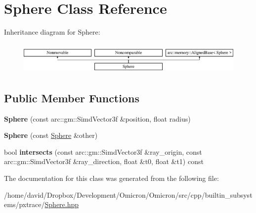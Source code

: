 \hypertarget{class_sphere}{}\section{Sphere Class Reference}
\label{class_sphere}
Inheritance diagram for Sphere\+:\begin{figure}[H]
\begin{center}
\leavevmode
\includegraphics[height=1.616162cm]{class_sphere}
\end{center}
\end{figure}
\subsection*{Public Member Functions}
\begin{DoxyCompactItemize}
\item 
{\bfseries Sphere} (const arc\+::gm\+::\+Simd\+Vector3f \&position, float radius)\hypertarget{class_sphere_a26338c92b077ca0e576b75bb1595fab0}{}\label{class_sphere_a26338c92b077ca0e576b75bb1595fab0}

\item 
{\bfseries Sphere} (const \hyperlink{class_sphere}{Sphere} \&other)\hypertarget{class_sphere_a36f78efd8703554711ab498323d7a63f}{}\label{class_sphere_a36f78efd8703554711ab498323d7a63f}

\item 
bool {\bfseries intersects} (const arc\+::gm\+::\+Simd\+Vector3f \&ray\+\_\+origin, const arc\+::gm\+::\+Simd\+Vector3f \&ray\+\_\+direction, float \&t0, float \&t1) const \hypertarget{class_sphere_aabb55bd5e1f16f3b17f1e0509511833f}{}\label{class_sphere_aabb55bd5e1f16f3b17f1e0509511833f}

\end{DoxyCompactItemize}


The documentation for this class was generated from the following file\+:\begin{DoxyCompactItemize}
\item 
/home/david/\+Dropbox/\+Development/\+Omicron/\+Omicron/src/cpp/builtin\+\_\+subsystems/pxtrace/\hyperlink{_sphere_8hpp}{Sphere.\+hpp}\end{DoxyCompactItemize}
